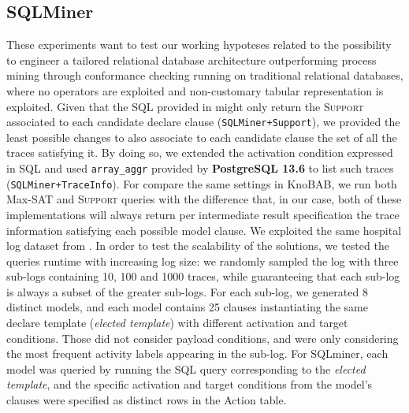\subsection{SQLMiner}\label{ssec:sqlmin}
These experiments want to test our working hypoteses related to the possibility to engineer a tailored relational database architecture outperforming process mining through conformance checking running on traditional relational databases, where no \LTLf operators are exploited and non-customary tabular representation is exploited. Given that the SQL provided in \cite{Schonig15,SchonigRCJM16} might only return the \textsc{Support} associated to each candidate declare clause (\texttt{SQLMiner+Support}), we provided the least possible changes to also associate to each candidate clause the set of all the traces satisfying it. By doing so, we extended the activation condition expressed in SQL and used \texttt{array\_aggr} provided by \textbf{PostgreSQL 13.6} to list such traces (\texttt{SQLMiner+TraceInfo}). For compare the same settings in KnoBAB, we run both Max-SAT and \textsc{Support} queries with the difference that, in our case, both of these implementations will always return per intermediate result specification the trace information satisfying each possible model clause.
We exploited the same hospital log dataset from \cite{SchonigRCJM16}. In order to test the scalability of the solutions, we tested the queries runtime with increasing log size: we randomly sampled the log with three sub-logs containing 10, 100 and 1000 traces, while guaranteeing that each sub-log is always a subset of the greater sub-logs. For each sub-log, we generated 8 distinct models, and each model contains 25 clauses instantiating the same declare template (\textit{elected template}) with different activation and target conditions. Those did not consider payload conditions, and were only considering the most frequent activity labels appearing in the sub-log. For SQLminer, each model was queried by running the SQL query corresponding to the \textit{elected template}, and the specific activation and target conditions from the model's clauses were specified as distinct rows in the \textsf{Action} table.


